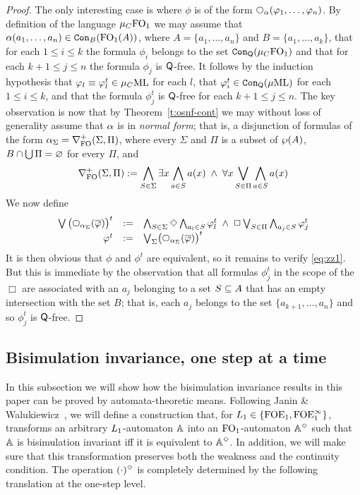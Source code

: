 \begin{proof}
The only interesting case is where $\phi$ is of the form 
$\nxt{\al}(\phi_{1},\ldots,\phi_{n})$.
By definition of the language $\mu_{C}\ofo$ we may assume that 
$\al(a_{1},\ldots,a_{n}) \in \cont{\ofo(A)}{B}$, where 
$A = \{ a_{1},\ldots,a_{n} \}$ and $B = \{ a_{1}, \ldots, a_{k} \}$,
that for each $1 \leq i \leq k$ the formula $\phi_{i}$ belongs to the set 
$\cont{\mu_{C}\ofo}{\qprop}$ and that for each $k+1\leq j \leq n$ the formula 
$\phi_{j}$ is $\qprop$-free.
It follows by the induction hypothesis 
that $\phi_{l} \equiv \phi_{l}^{t} \in \mucML$ for each $l$, 
that $\phi_{i}^{t} \in \cont{\muML}{\qprop}$ for each $1 \leq i \leq k$,
and that  the formula $\phi_{j}^{t}$ is $\qprop$-free for each $k+1\leq j \leq n$.
The key observation is now that by Theorem~\ref{t:osnf-cont} we may without 
loss of generality assume that $\al$ is in \emph{normal form}; that is, a 
disjunction of formulas of the form $\al_{\Sigma} = \posdgbnfofo{\Sigma}{\Pi}$,
where every $\Sigma$ and $\Pi$ is a subset of $\pow (A)$, $B \cap \bigcup\Pi =
\nada$ for every $\Pi$, and 
\[
\posdgbnfofo{\Sigma}{\Pi} \isdef 
\bigwedge_{S\in\Sigma} \exists x \bigwedge_{a \in S} a(x) 
\;\land\; \forall x \bigvee_{S\in\Pi} \bigwedge_{a \in S} a(x) 
\]
We now define
\[\begin{array}{rll}
\bigvee \big(\nxt{\al_{\Sigma}}(\ol{\phi})\big)^{t} & \isdef &
    \bigwedge_{S\in\Sigma} \Diamond \bigwedge_{a_{l} \in S} \phi_{l}^{t}
     \;\land\; 
     \Box \bigvee_{S\in\Pi} \bigwedge_{a_{j} \in S} \phi_{j}^{t} 
\\ \phi^{t} & \isdef & {\bigvee}_{\Sigma} \big(\nxt{\al_{\Sigma}}(\ol{\phi})\big)^{t}
\end{array}\]
It is then obvious that $\phi$ and $\phi^{t}$ are equivalent, so it remains to 
verify \eqref{eq:zz1}.
But this is immediate by the observation that all formulas $\phi_{j}^{t}$
in the scope of the $\Box$ are associated with an $a_{j}$ belonging to a set 
$S \sse A$ that has an empty intersection with the set $B$; that is, each 
$a_{j}$ belongs to the set $\{ a_{k+1}, \ldots, a_{n}\}$ and so $\phi_{j}^{t}$
is $\qprop$-free.
\end{proof}

\subsection{Bisimulation invariance, one step at a time}
\label{ss:bisinv}

In this subsection we will show how the bisimulation invariance results in this
paper can be proved by automata-theoretic means.
Following Janin \& Walukiewicz~\cite{Jan96}, 
we will define a construction that, for $\oslang \in \{{\ofoe},{\ofoei}\}$, 
transforms an arbitrary $\oslang$-automaton $\bbA$ into an $\ofo$-automaton 
$\bbA^{\tmod}$ such that $\bbA$ is bisimulation invariant iff it is equivalent
to $\bbA^{\tmod}$.
In addition, we will make sure that this transformation preserves both the
weakness and the continuity condition.
The operation $(\cdot)^{\tmod}$ is completely determined by the following 
translation at the one-step level.

